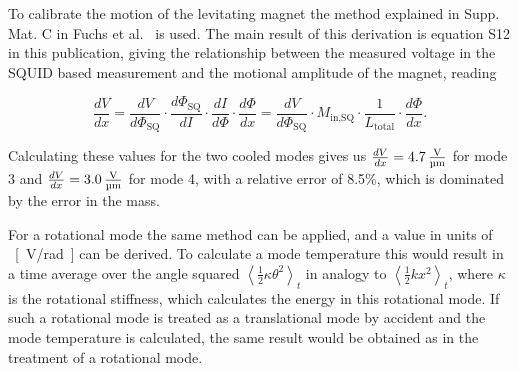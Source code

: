 To calibrate the motion of the levitating magnet the method explained in Supp. Mat. C in Fuchs et al.~\cite{Gravity} is used. The main result of this derivation is equation S12 in this publication, giving the relationship between the measured voltage in the SQUID based measurement and the motional amplitude of the magnet, reading

\begin{equation}
    \frac{dV}{dx} = 
    \frac{dV}{d\Phi_\text{SQ}}\cdot\frac{d\Phi_\text{SQ}}{dI}\cdot\frac{dI}{d\Phi}\cdot\frac{d\Phi}{dx} =
    \frac{dV}{d\Phi_\text{SQ}} \cdot M_\text{in,SQ} \cdot \frac{1}{L_\text{total}}\cdot \frac{d\Phi}{dx}.
\end{equation}

Calculating these values for the two cooled modes gives us $\frac{dV}{dx} = \SI{4.7}{{\frac{V}{\micro m}}}$ for mode 3 and $\frac{dV}{dx} = \SI{3.0}{{\frac{V}{\micro m}}}$ for mode 4, with a relative error of 8.5\%, which is dominated by the error in the mass.

For a rotational mode the same method can be applied, and a value in units of \SI{}{[V/rad]} can be derived. To calculate a mode temperature this would result in a 
time average over the angle squared $ \left< \frac{1}{2} \kappa \theta^2 \right>_t$ in analogy to $ \left< \frac{1}{2} k x^2 \right>_t$, where $\kappa$ is the rotational stiffness, which calculates the energy in this rotational mode. If such a rotational mode is treated as a translational mode by accident and the mode temperature is calculated, the same result would be obtained as in the treatment of a rotational mode. 

